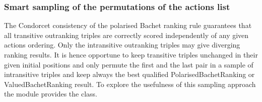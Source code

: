 \documentclass[a4paper,12pt,english]{sphinxhowto}
\begin{document}
\subsubsection{Smart sampling of the permutations of the actions list}
\label{\detokenize{pearls:smart-sampling-of-the-permutations-of-the-actions-list}}\label{\detokenize{pearls:bachetranking-rule-label}}
\sphinxAtStartPar
The Condorcet consistency of the polarised Bachet ranking rule guarantees that all transitive outranking triples are correctly scored independently of any given actions ordering. Only the intransitive outranking triples may give diverging ranking results. It is hence opportune to keep transitive triples unchanged in their given initial positions and only permute the first and the last pair in a sample of intransitive triples and keep always the best qualified PolarisedBachetRanking or ValuedBachetRanking result. To explore the usefulness of this sampling approach the  module provides the  class.
\end{document}
